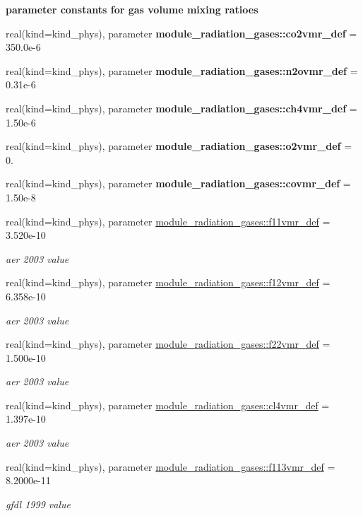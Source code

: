 \begin{Indent}\textbf{ parameter constants for gas volume mixing ratioes}\par
\begin{DoxyCompactItemize}
\item 
real(kind=kind\+\_\+phys), parameter {\bfseries module\+\_\+radiation\+\_\+gases\+::co2vmr\+\_\+def} = 350.\+0e-\/6
\item 
real(kind=kind\+\_\+phys), parameter {\bfseries module\+\_\+radiation\+\_\+gases\+::n2ovmr\+\_\+def} = 0.\+31e-\/6
\item 
real(kind=kind\+\_\+phys), parameter {\bfseries module\+\_\+radiation\+\_\+gases\+::ch4vmr\+\_\+def} = 1.\+50e-\/6
\item 
real(kind=kind\+\_\+phys), parameter {\bfseries module\+\_\+radiation\+\_\+gases\+::o2vmr\+\_\+def} = 0.
\item 
real(kind=kind\+\_\+phys), parameter {\bfseries module\+\_\+radiation\+\_\+gases\+::covmr\+\_\+def} = 1.\+50e-\/8
\item 
real(kind=kind\+\_\+phys), parameter \hyperlink{group__module__radiation__gases_ga23ae6bb6860bfefef0c281b7106f521e}{module\+\_\+radiation\+\_\+gases\+::f11vmr\+\_\+def} = 3.\+520e-\/10
\begin{DoxyCompactList}\small\item\em aer 2003 value \end{DoxyCompactList}\item 
real(kind=kind\+\_\+phys), parameter \hyperlink{group__module__radiation__gases_ga96d4f78070f30010626e0824b3421250}{module\+\_\+radiation\+\_\+gases\+::f12vmr\+\_\+def} = 6.\+358e-\/10
\begin{DoxyCompactList}\small\item\em aer 2003 value \end{DoxyCompactList}\item 
real(kind=kind\+\_\+phys), parameter \hyperlink{group__module__radiation__gases_gafd0018e96811ac64ef2abd8cab821eb5}{module\+\_\+radiation\+\_\+gases\+::f22vmr\+\_\+def} = 1.\+500e-\/10
\begin{DoxyCompactList}\small\item\em aer 2003 value \end{DoxyCompactList}\item 
real(kind=kind\+\_\+phys), parameter \hyperlink{group__module__radiation__gases_ga013f8faaee6df0c7c032e1786770c110}{module\+\_\+radiation\+\_\+gases\+::cl4vmr\+\_\+def} = 1.\+397e-\/10
\begin{DoxyCompactList}\small\item\em aer 2003 value \end{DoxyCompactList}\item 
real(kind=kind\+\_\+phys), parameter \hyperlink{group__module__radiation__gases_ga76ec88dc6284c48cfaae6cd05428b6dd}{module\+\_\+radiation\+\_\+gases\+::f113vmr\+\_\+def} = 8.\+2000e-\/11
\begin{DoxyCompactList}\small\item\em gfdl 1999 value \end{DoxyCompactList}\end{DoxyCompactItemize}
\end{Indent}
